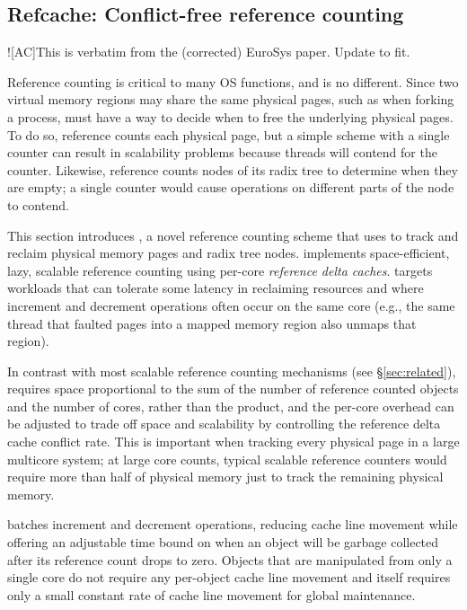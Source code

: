 \subsection{Refcache: Conflict-free reference counting}

\XXX![AC]{This is verbatim from the (corrected) EuroSys paper.  Update
  to fit.}

Reference counting is critical to many OS functions, and \vm is no
different.  Since two virtual memory regions may share the same physical
pages, such as when forking a process, \vm must have a way
to decide when to free the underlying physical pages.  To do so,
\vm reference counts each physical page, but a simple scheme with a
single counter can result in scalability problems because threads will
contend for the counter.  Likewise, \vm reference counts nodes of its
radix tree to determine when they are empty; a single counter would
cause operations on different parts of the node to contend.

This section introduces , a novel
reference counting scheme that \vm uses to track and reclaim physical
memory pages and radix tree nodes.
 implements space-efficient, lazy, scalable reference
counting using per-core \emph{reference delta caches}.   targets
workloads that can tolerate some latency in reclaiming resources and
where increment and decrement operations often occur on the same core
(e.g., the same thread that faulted pages into a mapped memory region
also unmaps that region).  

In contrast with most scalable
reference counting mechanisms (see \S\ref{sec:related}), 
requires space proportional to the sum of the number of reference
counted objects and the number of cores, rather than the product, and
the per-core overhead can be adjusted to trade off space and
scalability by controlling the reference delta cache conflict rate.  This is
important when tracking every physical page in a large multicore
system; at large core counts, typical scalable reference counters
would require more than half of physical memory just to track the
remaining physical memory.  

 batches increment and decrement
operations, reducing cache line movement while offering an adjustable
time bound on when an object will be garbage collected after its
reference count drops to zero.  Objects that are
manipulated from only a single core do not require any per-object cache
line movement and  itself requires only a small constant rate
of cache line movement for global maintenance.

